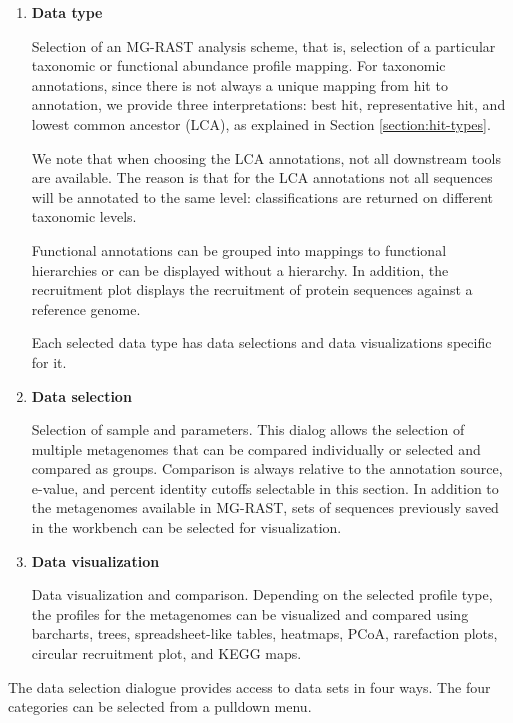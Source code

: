\documentclass[12pt,fullpage]{report}
\begin{document}
\begin{enumerate}

\item \textbf{Data type}

Selection of an MG-RAST analysis scheme, that is, selection of a particular taxonomic or functional abundance profile mapping. For taxonomic annotations, since there is not always a unique mapping from hit to annotation, we provide three interpretations: best hit, representative hit, and lowest common ancestor (LCA), as explained in Section \ref{section:hit-types}.

We note that when choosing the LCA annotations, not all downstream tools are available. The reason is that for the LCA annotations not all sequences will be annotated to the same level: classifications are returned on different taxonomic levels.

Functional annotations can be grouped into mappings to functional hierarchies or can be displayed without a hierarchy. In addition, the recruitment plot displays the recruitment of protein sequences against a reference genome.

Each selected data type has data selections and data visualizations specific for it.

\item \textbf{Data selection}

Selection of sample and parameters. This dialog allows the selection of multiple metagenomes that can be compared individually or selected and compared as groups. Comparison is always relative to the annotation source, e-value, and percent identity cutoffs selectable in this section. In addition to the metagenomes available in MG-RAST, sets of sequences previously saved in the workbench can be selected for visualization.

\item \textbf{Data visualization}

Data visualization and comparison. Depending on the selected profile type, the profiles for the metagenomes can be visualized and compared using barcharts, trees, spreadsheet-like tables, heatmaps, PCoA, rarefaction plots, circular recruitment plot, and KEGG maps.
\end{enumerate}


The data selection dialogue provides access to data sets in four ways. The four categories can be selected from a pulldown menu.
\end{document}
